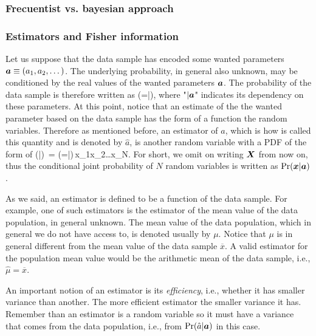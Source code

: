 \subsubsection{Frecuentist vs. bayesian approach}

\subsubsection{Estimators and Fisher information}

Let us suppose that the data sample has encoded some wanted parameters $\boldsymbol{a}\equiv(a_1,a_2,\dots)$.
The underlying probability, in general also unknown, may be conditioned by the real values of the wanted parameters $\boldsymbol{a}$.
The probability of the data sample is therefore written as
\be
  \prob(=|),
\ee
where "$|\boldsymbol{a}$" indicates its dependency on these parameters.
At this point, notice that an estimate of the the wanted parameter based on the data sample has the form of a function the random variables.
Therefore as mentioned before, an estimator of $a$, which is how is called this quantity and is denoted by $\hat{a}$, is another random variable with a PDF of the form of
\be
  \prob(|)\, = \prob(=|)\,x_1x_2\dots{}x_N.
\ee
For short, we omit on writing $\boldsymbol{X}$ from now on, thus the conditional joint probability of $N$ random variables is written as $\text{Pr}(\boldsymbol{x}|\boldsymbol{a})$.

As we said, an estimator is defined to be a function of the data sample.
For example, one of such estimators is the estimator of the mean value of the data population, in general unknown.
The mean value of the data population, which in general we do not have access to, is denoted usually by $\mu$.
Notice that $\mu$ is in general different from the mean value of the data sample $\overline{x}$.
A valid estimator for the population mean value would be the arithmetic mean of the data sample, i.e., $\hat{\mu}=\overline{x}$.

An important notion of an estimator is its \emph{efficiency}, i.e., whether it has smaller variance than another.
The more efficient estimator the smaller variance it has.
Remember than an estimator is a random variable so it must have a variance that comes from the data population, i.e., from $\text{Pr}(\hat{a}|\boldsymbol{a})$ in this case.


